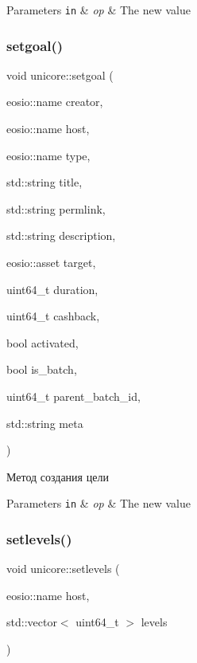 \begin{DoxyParams}[1]{Parameters}
\mbox{\tt in}  & {\em op} & The new value \\
\hline
\end{DoxyParams}
\mbox{\label{classunicore_aa2341c3f2393be329d759ef09f20367f}} 
\subsubsection{\texorpdfstring{setgoal()}{setgoal()}}
{\footnotesize\ttfamily void unicore\+::setgoal (\begin{DoxyParamCaption}\item[{eosio\+::name}]{creator,  }\item[{eosio\+::name}]{host,  }\item[{eosio\+::name}]{type,  }\item[{std\+::string}]{title,  }\item[{std\+::string}]{permlink,  }\item[{std\+::string}]{description,  }\item[{eosio\+::asset}]{target,  }\item[{uint64\+\_\+t}]{duration,  }\item[{uint64\+\_\+t}]{cashback,  }\item[{bool}]{activated,  }\item[{bool}]{is\+\_\+batch,  }\item[{uint64\+\_\+t}]{parent\+\_\+batch\+\_\+id,  }\item[{std\+::string}]{meta }\end{DoxyParamCaption})}



Метод создания цели 


\begin{DoxyParams}[1]{Parameters}
\mbox{\tt in}  & {\em op} & The new value \\
\hline
\end{DoxyParams}
\mbox{\label{classunicore_a9ebdfe87e84d1a283143d274f2337e84}} 
\subsubsection{\texorpdfstring{setlevels()}{setlevels()}}
{\footnotesize\ttfamily void unicore\+::setlevels (\begin{DoxyParamCaption}\item[{eosio\+::name}]{host,  }\item[{std\+::vector$<$ uint64\+\_\+t $>$}]{levels }\end{DoxyParamCaption})}



